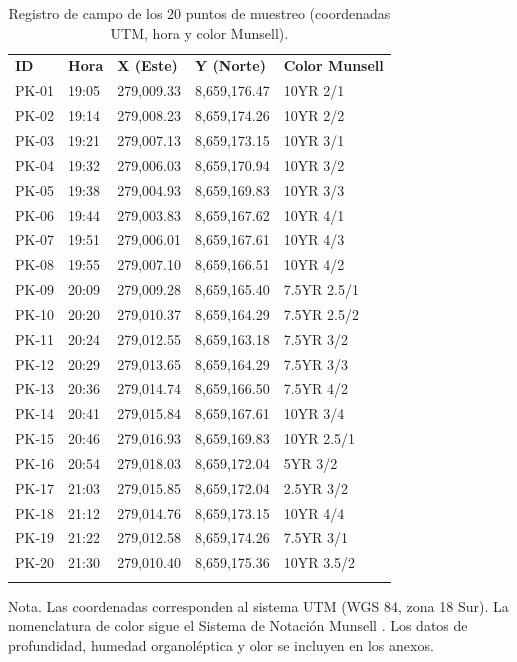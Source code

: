 \documentclass[fleqn]{jaes}
\begin{document}
\begin{table}[!ht]
\centering
\small
\caption{Registro de campo de los 20 puntos de muestreo (coordenadas UTM, hora y color Munsell).}\label{tab:coordenadas_muestreo}
\begin{tabular}{@{}lllll@{}}
\toprule
\textbf{ID} & \textbf{Hora} & \textbf{X (Este)} & \textbf{Y (Norte)} & \textbf{Color Munsell} \\
\colrule
PK-01 & 19:05 & 279,009.33 & 8,659,176.47 & 10YR 2/1 \\
PK-02 & 19:14 & 279,008.23 & 8,659,174.26 & 10YR 2/2 \\
PK-03 & 19:21 & 279,007.13 & 8,659,173.15 & 10YR 3/1 \\
PK-04 & 19:32 & 279,006.03 & 8,659,170.94 & 10YR 3/2 \\
PK-05 & 19:38 & 279,004.93 & 8,659,169.83 & 10YR 3/3 \\
PK-06 & 19:44 & 279,003.83 & 8,659,167.62 & 10YR 4/1 \\
PK-07 & 19:51 & 279,006.01 & 8,659,167.61 & 10YR 4/3 \\
PK-08 & 19:55 & 279,007.10 & 8,659,166.51 & 10YR 4/2 \\
PK-09 & 20:09 & 279,009.28 & 8,659,165.40 & 7.5YR 2.5/1 \\
PK-10 & 20:20 & 279,010.37 & 8,659,164.29 & 7.5YR 2.5/2 \\
PK-11 & 20:24 & 279,012.55 & 8,659,163.18 & 7.5YR 3/2 \\
PK-12 & 20:29 & 279,013.65 & 8,659,164.29 & 7.5YR 3/3 \\
PK-13 & 20:36 & 279,014.74 & 8,659,166.50 & 7.5YR 4/2 \\
PK-14 & 20:41 & 279,015.84 & 8,659,167.61 & 10YR 3/4 \\
PK-15 & 20:46 & 279,016.93 & 8,659,169.83 & 10YR 2.5/1 \\
PK-16 & 20:54 & 279,018.03 & 8,659,172.04 & 5YR 3/2 \\
PK-17 & 21:03 & 279,015.85 & 8,659,172.04 & 2.5YR 3/2 \\
PK-18 & 21:12 & 279,014.76 & 8,659,173.15 & 10YR 4/4 \\
PK-19 & 21:22 & 279,012.58 & 8,659,174.26 & 7.5YR 3/1 \\
PK-20 & 21:30 & 279,010.40 & 8,659,175.36 & 10YR 3.5/2 \\
\botrule
\end{tabular}
\begin{tabnote}
Nota. Las coordenadas corresponden al sistema UTM (WGS 84, zona 18 Sur). La nomenclatura de color sigue el Sistema de Notación Munsell \cite{MunsellColorServices2009}. Los datos de profundidad, humedad organoléptica y olor se incluyen en los anexos.
\end{tabnote}
\end{table}
\end{document}
